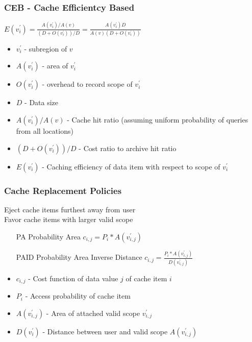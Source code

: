 \begin{frame}
\frametitle{CEB - Cache Efficientcy Based}


$E(v^{'}_i)=\frac{A(v^{'}_i)/A(v)}{(D+O(v^{'}_i))/D} = \frac{A(v^{'}_i)D}{A(v)(D+O(v^{'}_i))}$

\begin{itemize}
\item $v^{'}_i$ - subregion of $v$
\item $A(v^{'}_i)$ - area of $v^{'}_i$
\item $O(v^{'}_i)$ - overhead to record scope of $v^{'}_i$
\item $D$ - Data size
\item $A(v^{'}_i)/A(v)$ - Cache hit ratio (assuming uniform probability of queries from all locations)
\item $(D+O(v^{'}_i))/D$ - Cost ratio to archive hit ratio
\item $E(v^{'}_i)$ - Caching efficiency of data item with respect to scope of $v^{'}_i$
\end{itemize}

\end{frame}


\begin{frame}
\frametitle{Cache Replacement Policies}

Eject cache items furthest away from user\\
\vspace{1em}
Favor cache items with larger valid scope\\
\vspace{1em}

\begin{itemize}
\item[PA\hspace{1em}] Probability Area $c_{i,j} = P_i * A(v^{'}_{i,j})$
\item[PAID] Probability Area Inverse Distance  $c_{i,j} = \frac{P_i * A(v^{'}_{i,j})}{D(v^{'}_{i,j})}$
\end{itemize}

\begin{itemize}
\item $c_{i,j}$ - Cost function of data value $j$ of cache item $i$
\item $P_i$ - Access probability of cache item
\item $A(v^{'}_{i,j})$ - Area of attached valid scope $v^{'}_{i,j}$
\item $D(v^{'}_i)$ - Distance between user and valid scope $A(v^{'}_{i,j})$
\end{itemize}

\end{frame}


